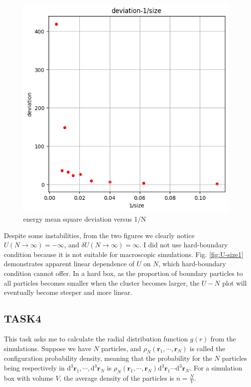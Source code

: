 \documentclass[letterpaper,12pt]{article}
\numberwithin{equation}{section}
\begin{document}
\begin{figure}[H]
    \centering
    \includegraphics{Project/deviation-size.png}
    \caption{energy mean square deviation versus 1/N}
    \label{fig:deviation-size}
\end{figure}
Despite some instabilities, from the two figures we clearly notice $U(N\rightarrow\infty)=-\infty$, and $\delta U(N\rightarrow\infty)=\infty$. I did not use hard-boundary condition because it is not suitable for macroscopic simulations. Fig. \ref{fig:U-size1} demonstrates apparent linear dependence of $U$ on $N$, which hard-boundary condition cannot offer. In a hard box, as the proportion of boundary particles to all particles becomes smaller when the cluster becomes larger, the $U-N$ plot will eventually become steeper and more linear.


\subsection{TASK4}
This task asks me to calculate the radial distribution function $g(r)$ from the simulations. Suppose we have $N$ particles, and $\rho_N(\boldsymbol{r}_1,\cdots,\boldsymbol{r}_N)$ is called the configuration probability density, meaning that the probability for the $N$ particles being respectively in $\mathrm{d}^3\boldsymbol{r}_1,\cdots,\mathrm{d}^3\boldsymbol{r}_N$ is $\rho_N(\boldsymbol{r}_1,\cdots,\boldsymbol{r}_N)\mathrm{d}^3\boldsymbol{r}_1\cdots\mathrm{d}^3\boldsymbol{r}_N$. For a simulation box with volume $V$, the average density of the particles is $n=\frac{N}{V}$. 
\end{document}
